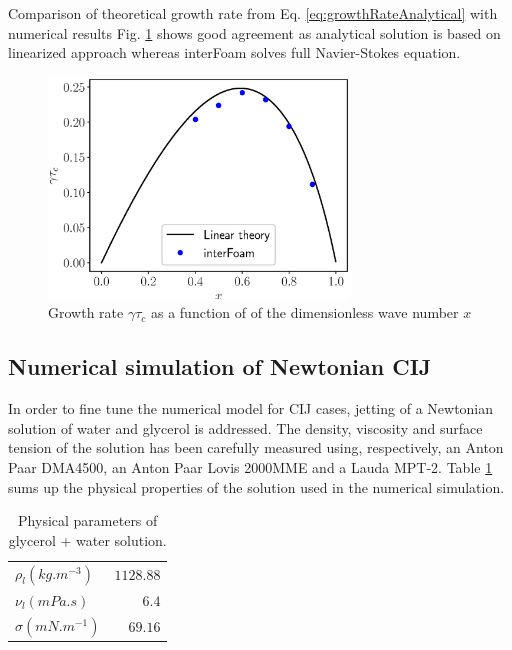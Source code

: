 \documentclass[twocolumn,10pt]{asme2ej}
\begin{document}
Comparison of theoretical growth rate from Eq. \ref{eq:growthRateAnalytical} with numerical results Fig. \ref{fig:growthrate} shows good agreement as analytical solution is based on linearized approach whereas interFoam solves full Navier-Stokes equation.

\begin{figure}[]
    \centering
    \includegraphics[width=8cm]{dispersion.eps}
    \caption{Growth rate $\gamma \tau_c$ as a function of of the dimensionless wave number $x$}
    \label{fig:growthrate}
\end{figure}

\subsection{Numerical simulation of Newtonian CIJ}\label{sec:glycerol}
In order to fine tune the numerical model for CIJ cases, jetting of a Newtonian solution of water and glycerol is addressed. The density, viscosity and surface tension of the solution has been carefully measured using, respectively, an Anton Paar DMA4500, an Anton Paar Lovis 2000MME and a Lauda MPT-2. Table \ref{tab:parametersGlycerol} sums up the physical properties of the solution used in the numerical simulation.

\begin{table}
    \begin{center}
        \begin{tabular}{lr}
            \hline
            $\rho_{l} (kg.m^{-3})$ & $1128.88$\\
            $\nu_{l} (mPa.s)$ & $6.4$\\
            $\sigma (mN.m^{-1})$ & $69.16$\\
            \hline
        \end{tabular}
    \end{center}
    
    \caption{\label{tab:parametersGlycerol} Physical parameters of glycerol + water solution.}
\end{table}
\end{document}
